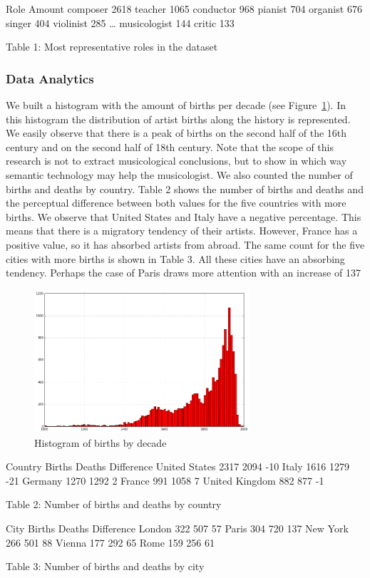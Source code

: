 Role	Amount
composer	2618
teacher	1065
conductor	968
pianist	704
organist	676
singer	404
violinist	285
…	
musicologist	144
critic	133

Table 1: Most representative roles in the dataset


\subsubsection{Data Analytics}

We built a histogram with the amount of births per decade (see Figure~\ref{fig:musicology:hist-births}). In this histogram the distribution of artist births along the history is represented. We easily observe that there is a peak of births on the second half of the 16th century and on the second half of 18th century. Note that the scope of this research is not to extract musicological conclusions, but to show in which way semantic technology may help the musicologist. 
We also counted the number of births and deaths by country. Table 2 shows the number of births and deaths and the perceptual difference between both values for the five countries with more births. We observe that United States and Italy have a negative percentage. This means that there is a migratory tendency of their artists. However, France has a positive value, so it has absorbed artists from abroad. The same count for the five cities with more births is shown in Table 3. All these cities have an absorbing tendency. Perhaps the case of Paris draws more attention with an increase of 137%

\begin{figure}[!ht]
	\centering
	\includegraphics[width=8cm]{ch05_musicology_pics/histogram-births.jpg}
	\caption{Histogram of births by decade
	\label{fig:musicology:hist-births}}
\end{figure}

Country	Births	Deaths	Difference
United States	2317	2094	-10%
Italy	1616	1279	-21%
Germany	1270	1292	2%
France	991	1058	7%
United Kingdom	882	877	-1%

Table 2: Number of births and deaths by country


City	Births	Deaths	Difference
London	322	507	57%
Paris	304	720	137%
New York	266	501	88%
Vienna	177	292	65%
Rome	159	256	61%

Table 3: Number of births and deaths by city
